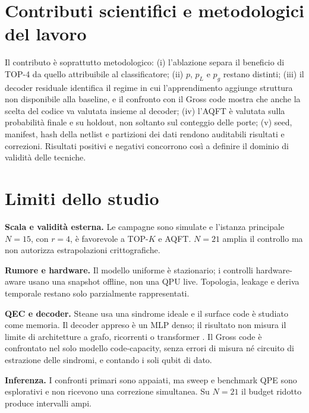\section{Contributi scientifici e metodologici del lavoro}\label{sec:finale_6_2}

Il contributo è soprattutto metodologico: (i) l'ablazione separa il beneficio di TOP-4 da quello attribuibile al classificatore; (ii) $p$, $p_L$ e $p_g$ restano distinti; (iii) il decoder residuale identifica il regime in cui l'apprendimento aggiunge struttura non disponibile alla baseline, e il confronto con il Gross code mostra che anche la scelta del codice va valutata insieme al decoder; (iv) l'AQFT è valutata sulla probabilità finale e su holdout, non soltanto sul conteggio delle porte; (v) seed, manifest, hash della netlist e partizioni dei dati rendono auditabili risultati e correzioni. Risultati positivi e negativi concorrono così a definire il dominio di validità delle tecniche.

\section{Limiti dello studio}\label{sec:finale_6_3}

\label{sec:finale_6_3_1}
\textbf{Scala e validità esterna.} Le campagne sono simulate e l'istanza principale $N=15$, con $r=4$, è favorevole a TOP-$K$ e AQFT. $N=21$ amplia il controllo ma non autorizza estrapolazioni crittografiche.

\label{sec:finale_6_3_2}
\textbf{Rumore e hardware.} Il modello uniforme è stazionario; i controlli hardware-aware usano una snapshot offline, non una QPU live. Topologia, leakage e deriva temporale restano solo parzialmente rappresentati.

\label{sec:finale_6_3_3}
\textbf{QEC e decoder.} Steane usa una sindrome ideale e il surface code è studiato come memoria. Il decoder appreso è un MLP denso; il risultato non misura il limite di architetture a grafo, ricorrenti o transformer \cite{alphaqubit2024,torlaiMelko2017,yan2026}. Il Gross code è confrontato nel solo modello code-capacity, senza errori di misura né circuito di estrazione delle sindromi, e contando i soli qubit di dato.

\label{sec:finale_6_3_4}
\textbf{Inferenza.} I confronti primari sono appaiati, ma sweep e benchmark QPE sono esplorativi e non ricevono una correzione simultanea. Su $N=21$ il budget ridotto produce intervalli ampi.

